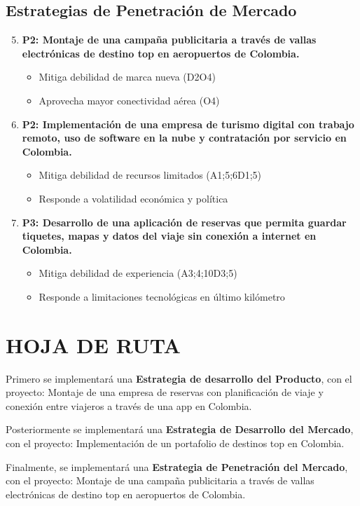 \documentclass[12pt,a4paper]{article}
\newcommand{\sectiontitle}[1]{\section{#1}}
\newcommand{\subsectiontitle}[1]{\subsection{#1}}
\begin{document}
\subsectiontitle{Estrategias de Penetración de Mercado}

\begin{enumerate}
    \setcounter{enumi}{4}
    \item \textbf{P2: Montaje de una campaña publicitaria a través de vallas electrónicas de destino top en aeropuertos de Colombia.}
    \begin{itemize}
        \item Mitiga debilidad de marca nueva (D2O4)
        \item Aprovecha mayor conectividad aérea (O4)
    \end{itemize}
    
    \item \textbf{P2: Implementación de una empresa de turismo digital con trabajo remoto, uso de software en la nube y contratación por servicio en Colombia.}
    \begin{itemize}
        \item Mitiga debilidad de recursos limitados (A1;5;6D1;5)
        \item Responde a volatilidad económica y política
    \end{itemize}
    
    \item \textbf{P3: Desarrollo de una aplicación de reservas que permita guardar tiquetes, mapas y datos del viaje sin conexión a internet en Colombia.}
    \begin{itemize}
        \item Mitiga debilidad de experiencia (A3;4;10D3;5)
        \item Responde a limitaciones tecnológicas en último kilómetro
    \end{itemize}
\end{enumerate}

\sectiontitle{HOJA DE RUTA}

Primero se implementará una \textbf{Estrategia de desarrollo del Producto}, con el proyecto: Montaje de una empresa de reservas con planificación de viaje y conexión entre viajeros a través de una app en Colombia. 

Posteriormente se implementará una \textbf{Estrategia de Desarrollo del Mercado}, con el proyecto: Implementación de un portafolio de destinos top en Colombia. 

Finalmente, se implementará una \textbf{Estrategia de Penetración del Mercado}, con el proyecto: Montaje de una campaña publicitaria a través de vallas electrónicas de destino top en aeropuertos de Colombia.
\end{document}
